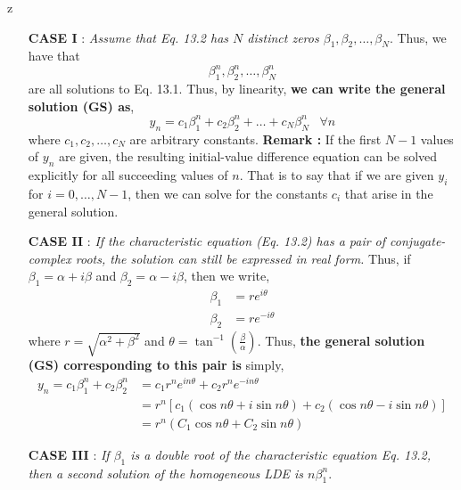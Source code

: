 z\documentclass[a4paper,12pt,twoside]{book}
\newcommand{\nll}[0]{\newline\newline}
\newcommand{\tit}[1]{\textit{#1}}
\begin{document}
\begin{itemize}
    \item[\textbf{CASE I}]{ : \tit{Assume that Eq. 13.2 has $N$ distinct zeros $\beta_1,\beta_2,\dots,\beta_N$}. 
    \nll
    Thus, we have that 
    \[\beta_1^n,\beta_2^n,\dots,\beta_N^n\]
    are all solutions to Eq. 13.1.
    \nll
    Thus, by linearity, \textbf{we can write the general solution (GS) as},
    \begin{equation}
        \boxed{y_n = c_1\beta_1^n + c_2\beta_2^n + \dots + c_N\beta_N^n\;\;\;\forall n}
    \end{equation}
    where $c_1,c_2,\dots,c_N$ are arbitrary constants.
    \nll
    \textbf{Remark : } If the first $N-1$ values of $y_n$ are given, the resulting initial-value difference equation can be solved explicitly for all succeeding values of $n$. That is to say that if we are given $y_i$ for $i=0,\dots,N-1$, then we can solve for the constants $c_i$ that arise in the general solution.
    } 
    \item[\textbf{CASE II}]{ : \tit{If the characteristic equation (Eq. 13.2) has a pair of conjugate-complex roots, the solution can still be expressed in real form.}
    \nll
    Thus, if $\beta_1 = \alpha+i\beta$ and $\beta_2 = \alpha - i\beta$, then we write,
    \begin{equation}
        \begin{split}
            \beta_1 &= re^{i\theta}\\
            \beta_2 &= re^{-i\theta}
        \end{split}
    \end{equation}
    where $r = \sqrt{\alpha^2 + \beta^2}$ and $\theta = \tan^{-1}\left(\frac{\beta}{\alpha}\right)$. Thus, \textbf{the general solution (GS) corresponding to this pair is} simply,
    \begin{equation}
        \begin{split}
            y_n = c_1\beta_1^n + c_2\beta_2^n &= c_1r^ne^{in\theta} + c_2 r^ne^{-in\theta}\\
            &= r^n \left[  c_1 (\cos n\theta + i\sin n \theta) + c_2 (\cos n\theta - i \sin n\theta) \right]\\
            &\boxed{=r^n(C_1 \cos n\theta + C_2 \sin n \theta)}
        \end{split}
    \end{equation}
    }
    \item[\textbf{CASE III}]{ : \tit{If $\beta_1$ is a double root of the characteristic equation Eq. 13.2, then a second solution of the homogeneous LDE is $n\beta_1^n$}.
}
\end{itemize}
\end{document}
